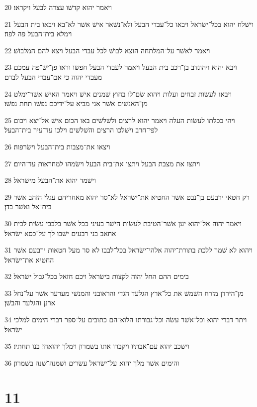 \par 20 ויאמר יהוא קדשׁו עצרה לבעל ויקראו׃
\par 21 וישׁלח יהוא בכל־ישׂראל ויבאו כל־עבדי הבעל ולא־נשׁאר אישׁ אשׁר לא־בא ויבאו בית הבעל וימלא בית־הבעל פה לפה׃
\par 22 ויאמר לאשׁר על־המלתחה הוצא לבושׁ לכל עבדי הבעל ויצא להם המלבושׁ׃
\par 23 ויבא יהוא ויהונדב בן־רכב בית הבעל ויאמר לעבדי הבעל חפשׂו וראו פן־ישׁ־פה עמכם מעבדי יהוה כי אם־עבדי הבעל לבדם׃
\par 24 ויבאו לעשׂות זבחים ועלות ויהוא שׂם־לו בחוץ שׁמנים אישׁ ויאמר האישׁ אשׁר־ימלט מן־האנשׁים אשׁר אני מביא על־ידיכם נפשׁו תחת נפשׁו׃
\par 25 ויהי ככלתו לעשׂות העלה ויאמר יהוא לרצים ולשׁלשׁים באו הכום אישׁ אל־יצא ויכום לפי־חרב וישׁלכו הרצים והשׁלשׁים וילכו עד־עיר בית־הבעל׃
\par 26 ויצאו את־מצבות בית־הבעל וישׂרפוה׃
\par 27 ויתצו את מצבת הבעל ויתצו את־בית הבעל וישׂמהו למחראות עד־היום׃
\par 28 וישׁמד יהוא את־הבעל מישׂראל׃
\par 29 רק חטאי ירבעם בן־נבט אשׁר החטיא את־ישׂראל לא־סר יהוא מאחריהם עגלי הזהב אשׁר בית־אל ואשׁר בדן׃
\par 30 ויאמר יהוה אל־יהוא יען אשׁר־הטיבת לעשׂות הישׁר בעיני ככל אשׁר בלבבי עשׂית לבית אחאב בני רבעים ישׁבו לך על־כסא ישׂראל׃
\par 31 ויהוא לא שׁמר ללכת בתורת־יהוה אלהי־ישׂראל בכל־לבבו לא סר מעל חטאות ירבעם אשׁר החטיא את־ישׂראל׃
\par 32 בימים ההם החל יהוה לקצות בישׂראל ויכם חזאל בכל־גבול ישׂראל׃
\par 33 מן־הירדן מזרח השׁמשׁ את כל־ארץ הגלעד הגדי והראובני והמנשׁי מערער אשׁר על־נחל ארנן והגלעד והבשׁן׃
\par 34 ויתר דברי יהוא וכל־אשׁר עשׂה וכל־גבורתו הלוא־הם כתובים על־ספר דברי הימים למלכי ישׂראל׃
\par 35 וישׁכב יהוא עם־אבתיו ויקברו אתו בשׁמרון וימלך יהואחז בנו תחתיו׃
\par 36 והימים אשׁר מלך יהוא על־ישׂראל עשׂרים ושׁמנה־שׁנה בשׁמרון׃

\chapter{11}

